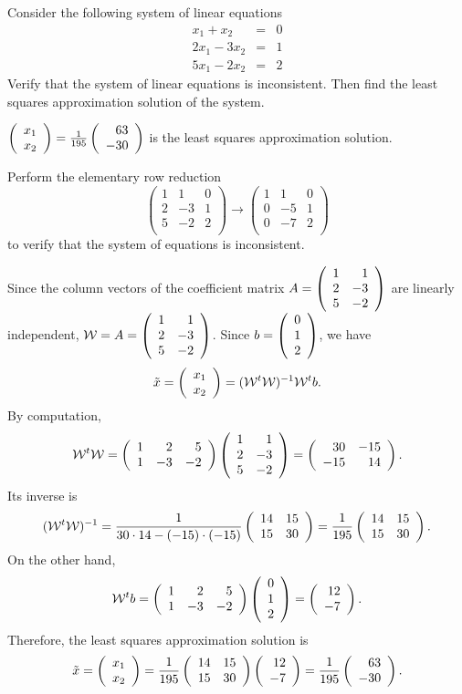 \documentclass{ximera}
\begin{document}
\begin{exercise} \label{YZ_9.1.13}

Consider the following system of linear equations
\[
\begin{array}{rcc}
x_1+x_2 &=&0\\
2x_1-3x_2&=&1\\
5x_1-2x_2&=&2
\end{array}
\]
Verify that the system of linear equations is inconsistent.  Then find the least squares approximation solution of the system.
\begin{solution}

\ans 
$\Matrix{x_1\\x_2}=\frac{1}{195}\Matrix{63\\-30}$ is the least squares approximation solution.

\soln 
Perform the elementary row reduction
\[
\left(
\begin{array}{cc|c}
1 & 1 &0 \\
2 &-3 &1 \\
5 &-2 &2\\
\end{array}
\right)\to \left(
\begin{array}{cc|c}
1 & 1 &0 \\
0 &-5 &1 \\
0 &-7 &2\\
\end{array}
\right)
\]
to verify that the system of equations is inconsistent.

Since the column vectors of the coefficient matrix $A=\Matrix{1&1\\2&-3\\5&-2}$ are linearly independent, $\WW=A=\Matrix{1&1\\2&-3\\5&-2}$. Since  $b=\Matrix{0\\1\\2}$, we have
\[
\tilde{x}=\Matrix{x_1\\x_2}=(\WW^t\WW)^{-1}\WW^tb.
\]
By computation,
\[
\WW^t\WW=\Matrix{1&2&5\\1&-3&-2}\Matrix{1&1\\2&-3\\5&-2}=\Matrix{30 &-15 \\-15 &14}.
\]
Its inverse is 
\[
(\WW^t\WW)^{-1}=\frac{1}{30\cdot 14-(-15)\cdot (-15)}\Matrix{14 &15\\
15 &30}=\frac{1}{195}\Matrix{14 &15\\
15 &30}.
\]
On the other hand,
\[
\WW^tb=\Matrix{1&2&5\\1&-3&-2}\Matrix{0\\1\\2}=\Matrix{12\\-7}.
\]
Therefore, the least squares approximation solution is
\[
\tilde{x}=\Matrix{x_1\\x_2}=\frac{1}{195}\Matrix{14 &15\\
15 &30}\Matrix{12\\-7}=\frac{1}{195}\Matrix{63\\-30}.
\]

\end{solution}
\end{exercise}
\end{document}
